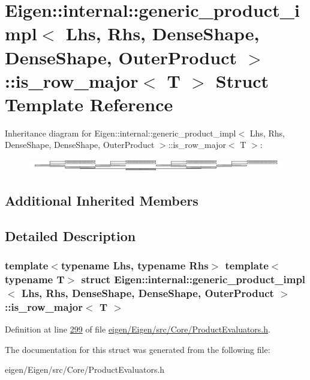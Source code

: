 \hypertarget{struct_eigen_1_1internal_1_1generic__product__impl_3_01_lhs_00_01_rhs_00_01_dense_shape_00_01_deb11e8f3beed15984390667915ab7b26a}{}\section{Eigen\+:\+:internal\+:\+:generic\+\_\+product\+\_\+impl$<$ Lhs, Rhs, Dense\+Shape, Dense\+Shape, Outer\+Product $>$\+:\+:is\+\_\+row\+\_\+major$<$ T $>$ Struct Template Reference}
\label{struct_eigen_1_1internal_1_1generic__product__impl_3_01_lhs_00_01_rhs_00_01_dense_shape_00_01_deb11e8f3beed15984390667915ab7b26a}
Inheritance diagram for Eigen\+:\+:internal\+:\+:generic\+\_\+product\+\_\+impl$<$ Lhs, Rhs, Dense\+Shape, Dense\+Shape, Outer\+Product $>$\+:\+:is\+\_\+row\+\_\+major$<$ T $>$\+:\begin{figure}[H]
\begin{center}
\leavevmode
\includegraphics[height=0.529501cm]{struct_eigen_1_1internal_1_1generic__product__impl_3_01_lhs_00_01_rhs_00_01_dense_shape_00_01_deb11e8f3beed15984390667915ab7b26a}
\end{center}
\end{figure}
\subsection*{Additional Inherited Members}


\subsection{Detailed Description}
\subsubsection*{template$<$typename Lhs, typename Rhs$>$\newline
template$<$typename T$>$\newline
struct Eigen\+::internal\+::generic\+\_\+product\+\_\+impl$<$ Lhs, Rhs, Dense\+Shape, Dense\+Shape, Outer\+Product $>$\+::is\+\_\+row\+\_\+major$<$ T $>$}



Definition at line \hyperlink{eigen_2_eigen_2src_2_core_2_product_evaluators_8h_source_l00299}{299} of file \hyperlink{eigen_2_eigen_2src_2_core_2_product_evaluators_8h_source}{eigen/\+Eigen/src/\+Core/\+Product\+Evaluators.\+h}.



The documentation for this struct was generated from the following file\+:\begin{DoxyCompactItemize}
\item 
eigen/\+Eigen/src/\+Core/\+Product\+Evaluators.\+h\end{DoxyCompactItemize}
